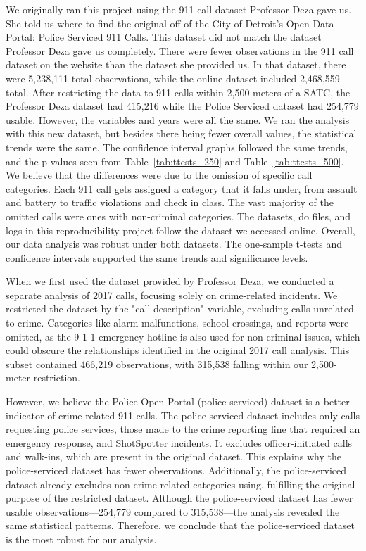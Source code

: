 \documentclass[12pt]{article}
\begin{document}
We originally ran this project using the 911 call dataset Professor Deza gave us. She told us where to find the original off of the City of Detroit's Open Data Portal: \href{https://data.detroitmi.gov/datasets/detroitmi::police-serviced-911-calls/about}{Police Serviced 911 Calls}. This dataset did not match the dataset Professor Deza gave us completely. There were fewer observations in the 911 call dataset on the website than the dataset she provided us. In that dataset, there were 5,238,111 total observations, while the online dataset included 2,468,559 total. After restricting the data to 911 calls within 2,500 meters of a SATC, the Professor Deza dataset had 415,216 while the Police Serviced dataset had 254,779 usable. However, the variables and years were all the same. We ran the analysis with this new dataset, but besides there being fewer overall values, the statistical trends were the same. The confidence interval graphs followed the same trends, and the p-values seen from Table~\ref{tab:ttests_250} and Table~\ref{tab:ttests_500}. We believe that the differences were due to the omission of specific call categories. Each 911 call gets assigned a category that it falls under, from assault and battery to traffic violations and check in class. The vast majority of the omitted calls were ones with non-criminal categories. The datasets, do files, and logs in this reproducibility project follow the dataset we accessed online. Overall, our data analysis was robust under both datasets. The one-sample t-tests and confidence intervals supported the same trends and significance levels. 

When we first used the dataset provided by Professor Deza, we conducted a separate analysis of 2017 calls, focusing solely on crime-related incidents. We restricted the dataset by the "call description" variable, excluding calls unrelated to crime. Categories like alarm malfunctions, school crossings, and reports were omitted, as the 9-1-1 emergency hotline is also used for non-criminal issues, which could obscure the relationships identified in the original 2017 call analysis. This subset contained 466,219 observations, with 315,538 falling within our 2,500-meter restriction.

However, we believe the Police Open Portal (police-serviced) dataset is a better indicator of crime-related 911 calls. The police-serviced dataset includes only calls requesting police services, those made to the crime reporting line that required an emergency response, and ShotSpotter incidents. It excludes officer-initiated calls and walk-ins, which are present in the original dataset. This explains why the police-serviced dataset has fewer observations. Additionally, the police-serviced dataset already excludes non-crime-related categories using, fulfilling the original purpose of the restricted dataset. Although the police-serviced dataset has fewer usable observations—254,779 compared to 315,538—the analysis revealed the same statistical patterns. Therefore, we conclude that the police-serviced dataset is the most robust for our analysis.
\end{document}
